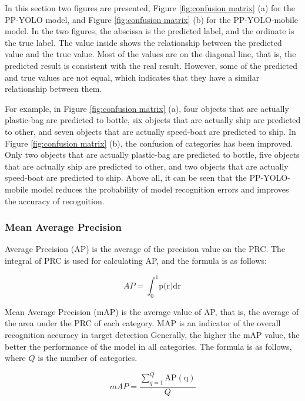 \documentclass[sensors,article,submit,moreauthors,pdftex]{Definitions/mdpi}
\begin{document}
In this section two figures are presented, Figure \ref{fig:confusion matrix} (a) for the PP-YOLO model, and Figure \ref{fig:confusion matrix} (b) for the PP-YOLO-mobile model. In the two figures, the abscissa is the predicted label, and the ordinate is the true label. The value inside shows the relationship between the predicted value and the true value. Most of the values are on the diagonal line, that is, the predicted result is consistent with the real result. However, some of the predicted and true values are not equal, which indicates that they have a similar relationship between them.

For example, in Figure \ref{fig:confusion matrix} (a), four objects that are actually plastic-bag are predicted to bottle, six objects that are actually ship are predicted to other, and seven objects that are actually speed-boat are predicted to ship. In Figure \ref{fig:confusion matrix} (b), the confusion of categories has been improved. Only two objects that are actually plastic-bag are predicted to bottle, five objects that are actually ship are predicted to other, and two objects that are actually speed-boat are predicted to ship. Above all, it can be seen that the PP-YOLO-mobile model reduces the probability of model recognition errors and improves the accuracy of recognition.





\subsubsection{Mean Average Precision}
Average Precision (AP) is the average of the precision value on the PRC. The integral of PRC is used for calculating AP, and the formula is as follows:

\begin{equation} 
{AP} = {\int_{0}^{1}\text{p(r)dr}} 
\end{equation}

Mean Average Precision (mAP) is the average value of AP, that is, the average of the area under the PRC of each category. MAP is an indicator of the overall recognition accuracy in target detection Generally, the higher the mAP value, the better the performance of the model in all categories. The formula is as follows, where $Q$ is the number of categories.

\begin{equation} 
{mAP} = {\frac {\sum _{q=1}^{Q}\operatorname {AP(q)} }{Q}}
\end{equation}
\end{document}

